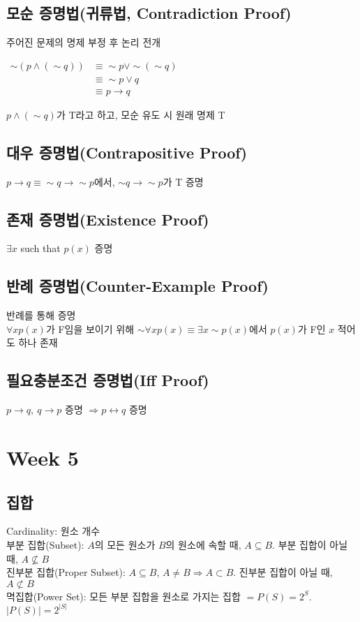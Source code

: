 \subsection{모순 증명법(귀류법, Contradiction Proof)}
주어진 문제의 명제 부정 후 논리 전개\\
\begin{flushleft}
    $\begin{aligned}
        \sim (p \land (\sim q)) &\equiv \sim p \lor \sim(\sim q)\\
        &\equiv \sim p \lor q\\
        &\equiv p \to q
    \end{aligned}$
\end{flushleft}$$$$
$p \land (\sim q)$가 T라고 하고, 모순 유도 시 원래 명제 T

\subsection{대우 증명법(Contrapositive Proof)}
$p \to q \equiv \sim q \to \sim p$에서, $\sim q \to \sim p$가 T 증명

\subsection{존재 증명법(Existence Proof)}
$\exists x$ such that $p(x)$ 증명

\subsection{반례 증명법(Counter-Example Proof)}
반례를 통해 증명\\
$\forall x p(x)$가 F임을 보이기 위해 $\sim \forall x p(x) \equiv \exists x \sim p(x)$에서  $p(x)$가 F인 $x$ 적어도 하나 존재

\subsection{필요충분조건 증명법(Iff Proof)}
$p \to q,\ q\to p$ 증명 $\Rightarrow p \leftrightarrow q$ 증명

\newpage
\section{Week 5}
\subsection{집합}
Cardinality: 원소 개수\\
부분 집합(Subset): $A$의 모든 원소가 $B$의 원소에 속할 때, $A\subseteq B$. 부분 집합이 아닐 때, $A \nsubseteq B$\\
진부분 집합(Proper Subset): $A \subseteq B$, $A \neq B \Longrightarrow A\subset B$. 진부분 집합이 아닐 때, $A \not\subset B$\\
멱집합(Power Set): 모든 부분 집합을 원소로 가지는 집합 $= P(S) = 2^S$. $|P(S)|=2^{|S|}$
